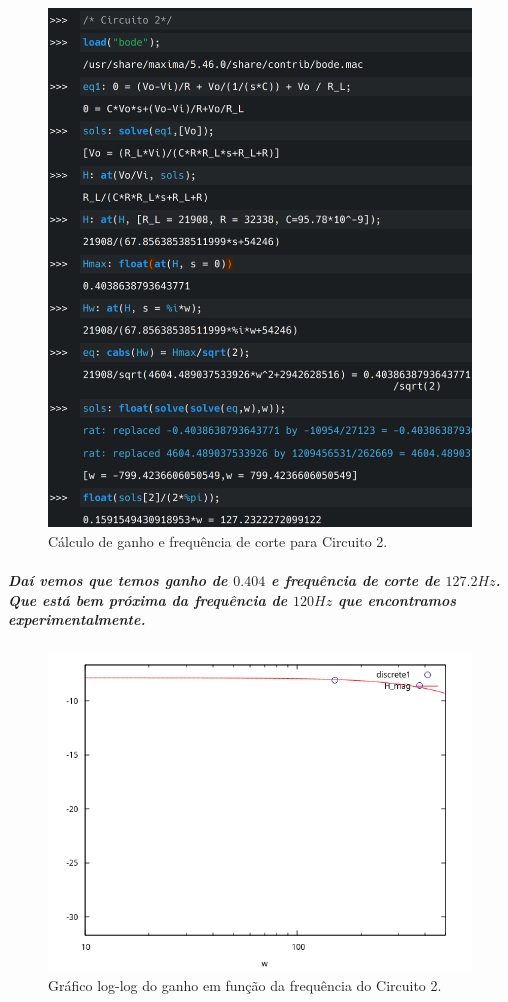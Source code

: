 \documentclass[12pt,twoside, a4paper, twocolumn]{article}
\begin{document}
\begin{figure}[h]
    \centering
    \includegraphics[width=1\columnwidth]{images/circuito2_freqreal.png}
    \caption{Cálculo de ganho e frequência de corte para Circuito 2.}
\end{figure}


\subparagraph*{Daí vemos que temos ganho de $0.404$ e frequência de corte de $127.2Hz$. Que está bem próxima da frequência de $120Hz$ que encontramos experimentalmente.}


\begin{figure}[h]
    \centering
    \includegraphics[width=1\columnwidth]{images/circuito2wx.png}
    \caption{Gráfico log-log do ganho em função da frequência do Circuito 2.}
\end{figure}
\end{document}
